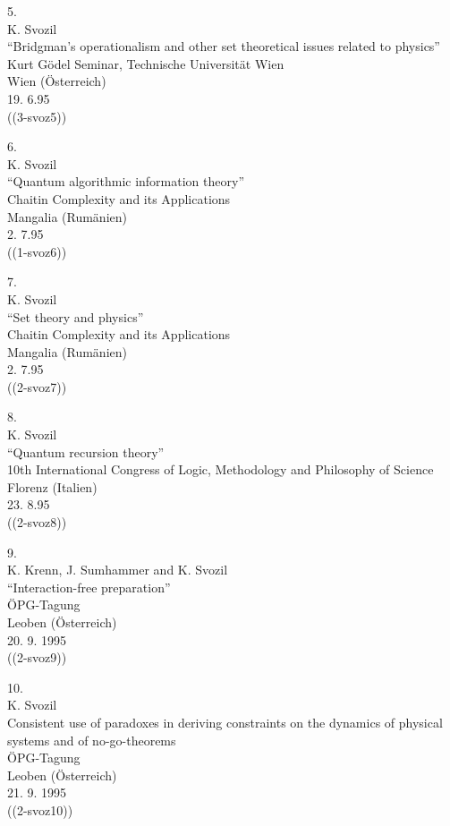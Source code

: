 5.\\
K. Svozil\\
``Bridgman's operationalism and other set theoretical issues related to
physics''\\
Kurt G\"odel Seminar, Technische Universit\"at Wien\\
Wien (\"Osterreich)\\
19. 6.95    \\
((3-svoz5))

6.\\
K. Svozil\\
``Quantum algorithmic information theory''\\
Chaitin Complexity and its Applications\\
Mangalia (Rum\"anien) \\
2. 7.95       \\
((1-svoz6))

7.\\
K. Svozil\\
``Set theory and physics''     \\
Chaitin Complexity and its Applications\\
Mangalia (Rum\"anien) \\
2. 7.95         \\
((2-svoz7))


8.\\
K. Svozil\\
``Quantum recursion theory''     \\
10th International Congress of Logic, Methodology and Philosophy of
Science\\
Florenz (Italien) \\
23. 8.95          \\
((2-svoz8))


9.\\
K. Krenn, J. Sumhammer and K. Svozil\\
``Interaction-free preparation''\\
\"OPG-Tagung\\
Leoben (\"Osterreich)\\
20. 9. 1995         \\
((2-svoz9))


10.\\
K. Svozil\\
Consistent use of paradoxes in deriving constraints on the
dynamics of physical systems and of no-go-theorems\\
\"OPG-Tagung\\
Leoben (\"Osterreich)\\
21. 9. 1995           \\
((2-svoz10))

